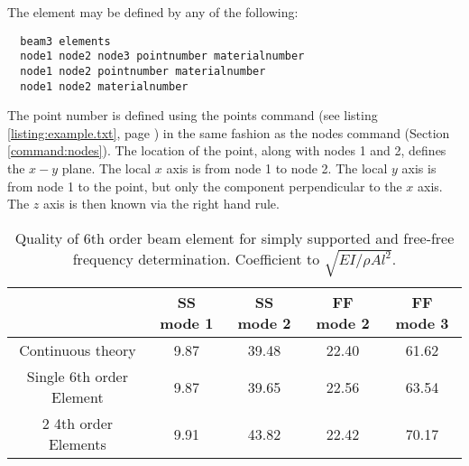 \documentclass[12pt]{article}
\newcommand*{\command}[1]{\textsf{#1}}
\newcommand{\lstref}[1]{(see listing \ref{listing:#1}, page
  \pageref{listing:#1})}
\begin{document}
The element may be defined by any of the following:\\
\begin{lstlisting}
  beam3 elements 
  node1 node2 node3 pointnumber materialnumber 
  node1 node2 pointnumber materialnumber 
  node1 node2 materialnumber
\end{lstlisting}
The point number is defined using the \command{points} command
\lstref{example.txt} in the same fashion as the \command{nodes}
command (Section \ref{command:nodes}). The location of the point,
along with nodes 1 and 2, defines the $x-y$ plane. The local $x$ axis
is from node 1 to node 2. The local $y$ axis is from node 1 to the
point, but only the component perpendicular to the $x$ axis. The $z$
axis is then known via the right hand rule.

\begin{table}
\begin{tabular}[h]{|c|c|c|c|c|}
\hline
 &
SS mode 1&
SS mode 2 &
FF mode 2 &
FF mode 3
\\ \hline
Continuous theory &
9.87 &
39.48 &
22.40 &
61.62
\\ \hline
Single 6th order Element &
9.87 &
39.65 &
22.56 &
63.54
\\ \hline
2 4th order Elements &
9.91 &
43.82 &
22.42 &
70.17
\\ \hline
\end{tabular}
\caption{Quality of 6th order beam element for simply supported and free-free frequency determination. Coefficient to $\sqrt{EI/\rho A l^{2}}$.}
\end{table}
\end{document}
